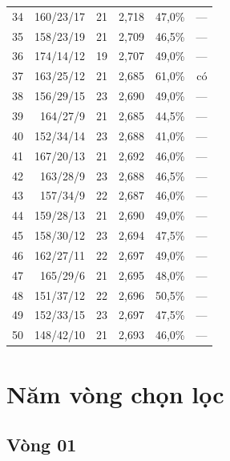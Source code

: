 \begin{center}
\begin{tabular}{@{}rrrrrr@{}}
34 & 160/23/17 & 21 & 2,718 & 47,0\% & — \\

35 & 158/23/19 & 21 & 2,709 & 46,5\% & — \\

36 & 174/14/12 & 19 & 2,707 & 49,0\% & — \\

37 & 163/25/12 & 21 & 2,685 & 61,0\% & có \\

38 & 156/29/15 & 23 & 2,690 & 49,0\% & — \\

39 & 164/27/9 & 21 & 2,685 & 44,5\% & — \\

40 & 152/34/14 & 23 & 2,688 & 41,0\% & — \\

41 & 167/20/13 & 21 & 2,692 & 46,0\% & — \\

42 & 163/28/9 & 23 & 2,688 & 46,5\% & — \\

43 & 157/34/9 & 22 & 2,687 & 46,0\% & — \\

44 & 159/28/13 & 21 & 2,690 & 49,0\% & — \\

45 & 158/30/12 & 23 & 2,694 & 47,5\% & — \\

46 & 162/27/11 & 22 & 2,697 & 49,0\% & — \\

47 & 165/29/6 & 21 & 2,695 & 48,0\% & — \\

48 & 151/37/12 & 22 & 2,696 & 50,5\% & — \\

49 & 152/33/15 & 23 & 2,697 & 47,5\% & — \\

50 & 148/42/10 & 21 & 2,693 & 46,0\% & — \\

\bottomrule

\end{tabular}

\end{center}

\section{Năm vòng chọn lọc}

\subsection{Vòng 01}

